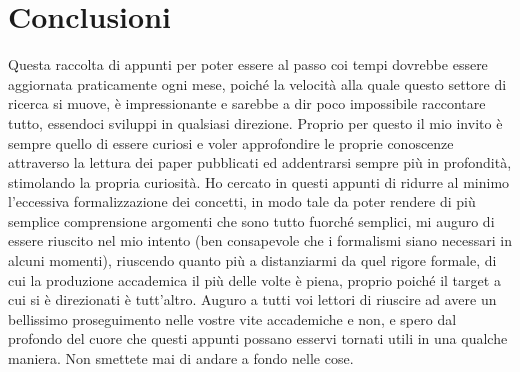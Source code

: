 \chapter*{Conclusioni}

Questa raccolta di appunti per poter essere al passo coi tempi dovrebbe essere aggiornata praticamente ogni mese, poiché la velocità alla quale questo settore di ricerca si muove, è impressionante e sarebbe a dir poco impossibile raccontare tutto, essendoci sviluppi in qualsiasi direzione. Proprio per questo il mio invito è sempre quello di essere curiosi e voler approfondire le proprie conoscenze attraverso la lettura dei paper pubblicati ed addentrarsi sempre più in profondità, stimolando la propria curiosità. Ho cercato in questi appunti di ridurre al minimo l'eccessiva formalizzazione dei concetti, in modo tale da poter rendere di più semplice comprensione argomenti che sono tutto fuorché semplici, mi auguro di essere riuscito nel mio intento (ben consapevole che i formalismi siano necessari in alcuni momenti), riuscendo quanto più a distanziarmi da quel rigore formale, di cui la produzione accademica il più delle volte è piena, proprio poiché il target a cui si è direzionati è tutt'altro. Auguro a tutti voi lettori di riuscire ad avere un bellissimo proseguimento nelle vostre vite accademiche e non, e spero dal profondo del cuore che questi appunti possano esservi tornati utili in una qualche maniera. Non smettete mai di andare a fondo nelle cose.